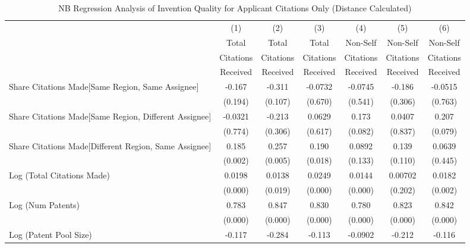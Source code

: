\begin{table}[htbp]\centering
\caption{NB Regression Analysis of Invention Quality for Applicant Citations Only (Distance Calculated) \label{a.model123192021}}
\scriptsize
\singlespacing
\begin{tabular}{l*{6}{c}}
\hline\hline
                &\multicolumn{1}{c}{(1)}&\multicolumn{1}{c}{(2)}&\multicolumn{1}{c}{(3)}&\multicolumn{1}{c}{(4)}&\multicolumn{1}{c}{(5)}&\multicolumn{1}{c}{(6)}\\
                &\multicolumn{1}{c}{Total}&\multicolumn{1}{c}{Total}&\multicolumn{1}{c}{Total}&\multicolumn{1}{c}{Non-Self}&\multicolumn{1}{c}{Non-Self}&\multicolumn{1}{c}{Non-Self}\\
                &\multicolumn{1}{c}{Citations}&\multicolumn{1}{c}{Citations}&\multicolumn{1}{c}{Citations}&\multicolumn{1}{c}{Citations}&\multicolumn{1}{c}{Citations}&\multicolumn{1}{c}{Citations}\\
                 &\multicolumn{1}{c}{Received}&\multicolumn{1}{c}{Received}&\multicolumn{1}{c}{Received}&\multicolumn{1}{c}{Received}&\multicolumn{1}{c}{Received}&\multicolumn{1}{c}{Received}\\
\hline
Share Citations Made[Same Region, Same Assignee]&   -0.167&   -0.311&  -0.0732&  -0.0745&   -0.186&  -0.0515\\
                &  (0.194)&  (0.107)&  (0.670)&  (0.541)&  (0.306)&  (0.763)\\
Share Citations Made[Same Region, Different Assignee]&  -0.0321&   -0.213&   0.0629&    0.173&   0.0407&    0.207\\
                &  (0.774)&  (0.306)&  (0.617)&  (0.082)&  (0.837)&  (0.079)\\
Share Citations Made[Different Region, Same Assignee]&    0.185&    0.257&    0.190&   0.0892&    0.139&   0.0639\\
                &  (0.002)&  (0.005)&  (0.018)&  (0.133)&  (0.110)&  (0.445)\\
Log (Total Citations Made)&   0.0198&   0.0138&   0.0249&   0.0144&  0.00702&   0.0182\\
                &  (0.000)&  (0.019)&  (0.000)&  (0.000)&  (0.202)&  (0.002)\\
Log (Num Patents)&    0.783&    0.847&    0.830&    0.780&    0.823&    0.842\\
                &  (0.000)&  (0.000)&  (0.000)&  (0.000)&  (0.000)&  (0.000)\\
Log (Patent Pool Size)&   -0.117&   -0.284&   -0.113&  -0.0902&   -0.212&   -0.116\\

\end{tabular}
\end{table}
